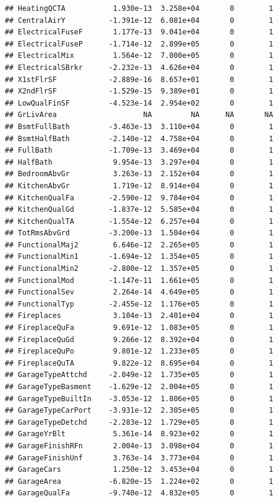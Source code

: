 \documentclass[
]{article}
\begin{document}
\begin{verbatim}
## HeatingQCTA           1.930e-13  3.258e+04       0        1
## CentralAirY          -1.391e-12  6.081e+04       0        1
## ElectricalFuseF       1.177e-13  9.041e+04       0        1
## ElectricalFuseP      -1.714e-12  2.899e+05       0        1
## ElectricalMix         1.564e-12  7.000e+05       0        1
## ElectricalSBrkr      -2.232e-13  4.626e+04       0        1
## X1stFlrSF            -2.889e-16  8.657e+01       0        1
## X2ndFlrSF            -1.529e-15  9.389e+01       0        1
## LowQualFinSF         -4.523e-14  2.954e+02       0        1
## GrLivArea                    NA         NA      NA       NA
## BsmtFullBath         -3.463e-13  3.110e+04       0        1
## BsmtHalfBath         -2.140e-12  4.758e+04       0        1
## FullBath             -1.709e-13  3.469e+04       0        1
## HalfBath              9.954e-13  3.297e+04       0        1
## BedroomAbvGr          3.263e-13  2.152e+04       0        1
## KitchenAbvGr          1.719e-12  8.914e+04       0        1
## KitchenQualFa        -2.590e-12  9.784e+04       0        1
## KitchenQualGd        -1.837e-12  5.585e+04       0        1
## KitchenQualTA        -1.554e-12  6.257e+04       0        1
## TotRmsAbvGrd         -3.200e-13  1.504e+04       0        1
## FunctionalMaj2        6.646e-12  2.265e+05       0        1
## FunctionalMin1       -1.694e-12  1.354e+05       0        1
## FunctionalMin2       -2.800e-12  1.357e+05       0        1
## FunctionalMod        -1.147e-11  1.661e+05       0        1
## FunctionalSev         2.264e-14  4.649e+05       0        1
## FunctionalTyp        -2.455e-12  1.176e+05       0        1
## Fireplaces            3.104e-13  2.401e+04       0        1
## FireplaceQuFa         9.691e-12  1.083e+05       0        1
## FireplaceQuGd         9.266e-12  8.392e+04       0        1
## FireplaceQuPo         9.801e-12  1.233e+05       0        1
## FireplaceQuTA         9.822e-12  8.695e+04       0        1
## GarageTypeAttchd     -2.049e-12  1.735e+05       0        1
## GarageTypeBasment    -1.629e-12  2.004e+05       0        1
## GarageTypeBuiltIn    -3.053e-12  1.806e+05       0        1
## GarageTypeCarPort    -3.931e-12  2.305e+05       0        1
## GarageTypeDetchd     -2.283e-12  1.729e+05       0        1
## GarageYrBlt           5.361e-14  8.923e+02       0        1
## GarageFinishRFn       2.004e-13  3.098e+04       0        1
## GarageFinishUnf       3.763e-14  3.773e+04       0        1
## GarageCars            1.250e-12  3.453e+04       0        1
## GarageArea           -6.820e-15  1.224e+02       0        1
## GarageQualFa         -9.740e-12  4.832e+05       0        1

\end{verbatim}
\end{document}
